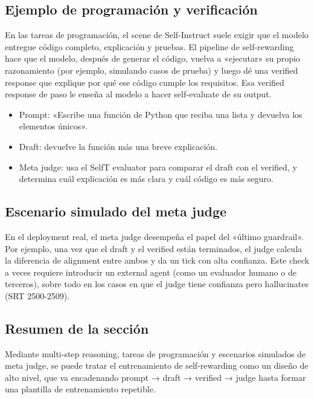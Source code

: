 \subsection{Ejemplo de programación y verificación}
En las tareas de programación, el scene de Self-Instruct suele exigir que el modelo entregue código completo, explicación y pruebas. El pipeline de self-rewarding hace que el modelo, después de generar el código, vuelva a «ejecutar» su propio razonamiento (por ejemplo, simulando casos de prueba) y luego dé una verified response que explique por qué ese código cumple los requisitos. Esa verified response de paso le enseña al modelo a hacer self-evaluate de su output.

\begin{itemize}
    \item Prompt: «Escribe una función de Python que reciba una lista y devuelva los elementos únicos».
    \item Draft: devuelve la función más una breve explicación.
    \item Meta judge: usa el SelfT evaluator para comparar el draft con el verified, y determina cuál explicación es más clara y cuál código es más seguro.
\end{itemize}

\subsection{Escenario simulado del meta judge}
En el deployment real, el meta judge desempeña el papel del «último guardrail». Por ejemplo, una vez que el draft y el verified están terminados, el judge calcula la diferencia de alignment entre ambos y da un tick con alta confianza. Este check a veces requiere introducir un external agent (como un evaluador humano o de terceros), sobre todo en los casos en que el judge tiene confianza pero hallucinates (SRT 2500-2509).

\subsection{Resumen de la sección}
Mediante multi-step reasoning, tareas de programación y escenarios simulados de meta judge, se puede tratar el entrenamiento de self-rewarding como un diseño de alto nivel, que va encadenando prompt → draft → verified → judge hasta formar una plantilla de entrenamiento repetible.

